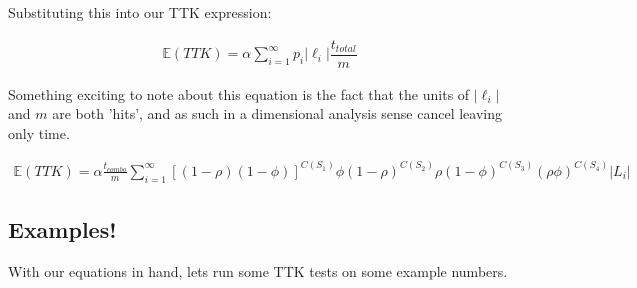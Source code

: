 \documentclass{article}
\begin{document}
Substituting this into our TTK expression:

\begin{align*}
\mathbb{E}(TTK) =  \alpha \sum_{i=1}^{\infty} p_i |\ell_i| \dfrac{t_{total}}{m}
\end{align*}

Something exciting to note about this equation is the fact that the units of $|\ell_i|$ and $m$ are both 'hits', and as such in a dimensional analysis sense cancel leaving only time.


\begin{align*}
\mathbb{E}(TTK) =  \alpha \frac{t_{combo}}{m}\sum_{i=1}^{\infty} [(1-\rho)(1-\phi)]^{C(S_1)} \phi(1-\rho)^{C(S_2)} \rho(1-\phi)^{C(S_3)} (\rho\phi)^{C(S_4)} |L_i|
\end{align*}


\pagebreak

\subsection{Examples!}

With our equations in hand, lets run some TTK tests on some example numbers.
\end{document}
